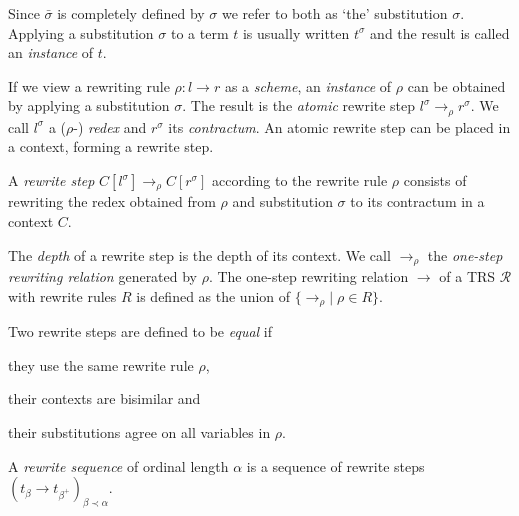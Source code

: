 Since $\bar{\sigma}$ is completely defined by $\sigma$ we refer to both as
`the' substitution $\sigma$.
Applying a substitution $\sigma$ to a term $t$ is usually written
$t^\sigma$ and the result is called an \emph{instance} of $t$.

If we view a rewriting rule $\rho : l \rightarrow r$ as a \emph{scheme}, an
\emph{instance} of $\rho$ can be obtained by applying a substitution
$\sigma$. The result is the \emph{atomic} rewrite step $l^\sigma
\rightarrow_\rho r^\sigma$. We call $l^\sigma$ a ($\rho$-) \emph{redex} and
$r^\sigma$ its \emph{contractum}. An atomic rewrite step can be placed in a
context, forming a rewrite step.

\begin{definition}%
A \emph{rewrite step} $C[l^\sigma] \rightarrow_\rho C[r^\sigma]$ according to
the rewrite rule $\rho$ consists of rewriting the redex obtained from
$\rho$ and substitution $\sigma$ to its contractum in a context $C$.
\end{definition}

The \emph{depth} of a rewrite step is the depth of its context. We
call $\rightarrow_\rho$ the \emph{one-step rewriting relation}
generated by $\rho$. The one-step rewriting relation $\rightarrow$ of
a TRS $\mathcal{R}$ with rewrite rules $R$ is defined as the union of
$\{ \rightarrow_\rho | \; \rho \in R \}$.


\begin{definition}\label{def:stepeq}%
Two rewrite steps are defined to be \emph{equal} if
\begin{compactenum}
  \item they use the same rewrite rule $\rho$,
  \item their contexts are bisimilar and
  \item their substitutions agree on all variables in $\rho$.
\end{compactenum}
\end{definition}

\begin{definition}\label{def:seq}%
A \emph{rewrite sequence} of ordinal length $\alpha$ is a sequence of rewrite
steps $(t_\beta \rightarrow t_{\beta^+})_{\beta \prec \alpha}$.
\end{definition}

